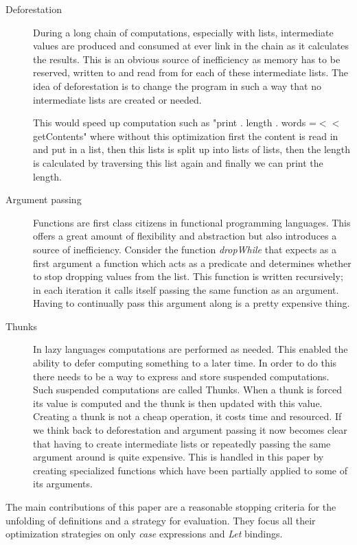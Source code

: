 \documentclass[11pt,twoside,a4paper]{article}
\begin{document}
\begin{description}
\item[Deforestation]{ During a long chain of computations, especially with lists, intermediate values are produced and consumed at ever link in the chain as it calculates the results. This is an obvious source of inefficiency as memory has to be reserved, written to and read from for each of these intermediate lists. The idea of deforestation is to change the program in such a way that no intermediate lists are created or needed.

This would speed up computation such as "print . length . words =$<$$<$ getContents" where without this optimization first the content is read in and put in a list, then this lists is split up into lists of lists, then the length is calculated by traversing this list again and finally we can print the length.
}
\item[Argument passing]{ Functions are first class citizens in functional programming languages. This offers a great amount of flexibility and abstraction but also introduces a source of inefficiency. Consider the function \emph{dropWhile} that expects as a first argument a function which acts as a predicate and determines whether to stop dropping values from the list. 
This function is written recursively; in each iteration it calls itself passing the same function as an argument. Having to continually pass this argument along is a pretty expensive thing.
}
\item[Thunks]{ In lazy languages computations are performed as needed. This enabled the ability to defer computing something to a later time. In order to do this there needs to be a way to express and store suspended computations. Such suspended computations are called Thunks. When a thunk is forced its value is computed and the thunk is then updated with this value. Creating a thunk is not a cheap operation, it costs time and resourced. If we think back to deforestation and argument passing it now becomes clear that having to create intermediate lists or repeatedly passing the same argument around is quite expensive.  This is handled in this paper by creating specialized functions which have been partially applied to some of its arguments.}
\end{description}

The main contributions of this paper are a reasonable stopping criteria for the unfolding of definitions and a strategy for evaluation. They focus all their optimization strategies on only \emph{case} expressions and \emph{Let} bindings.
\end{document}
